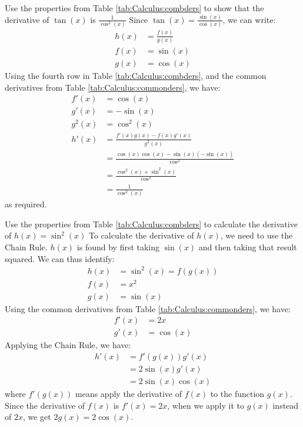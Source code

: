 \begin{example}{Use the properties from Table \ref{tab:Calculus:combders} to show that the derivative of $\tan(x)$ is $\frac{1}{\cos^2(x)}$}
Since $\tan(x)=\frac{\sin(x)}{\cos(x)}$, we can write:
\begin{align*}
h(x) &= \frac{f(x)}{g(x)} \\
f(x) &= \sin(x)\\
g(x) &= \cos(x)
\end{align*}
Using the fourth row in Table \ref{tab:Calculus:combders}, and the common derivatives from Table \ref{tab:Calculus:commonders}, we have:
\begin{align*}
f'(x) &= \cos(x) \\
g'(x) &= -\sin(x) \\
g^2(x) &= \cos^2(x) \\
h'(x) &=\frac{f'(x)g(x)-f(x)g'(x)}{g^2(x)}\\ 
&= \frac{\cos(x)\cos(x) - \sin(x) (-\sin(x))}{\cos^2}\\
&=\frac{\cos^2(x)+\sin^2(x)}{\cos^2}\\
&=\frac{1}{\cos^2(x)}
\end{align*}
as required.
\end{example}

\begin{example}{Use the properties from Table \ref{tab:Calculus:combders} to calculate the derivative of $h(x)=\sin^2(x)$}
To calculate the derivative of $h(x)$, we need to use the Chain Rule. $h(x)$ is found by first taking $\sin(x)$ and then taking that result squared. We can thus identify:
\begin{align*}
h(x) &= \sin^2(x) = f(g(x))\\
f(x) &= x^2 \\
g(x) &= \sin(x)
\end{align*}
Using the common derivatives from Table \ref{tab:Calculus:commonders}, we have:
\begin{align*}
f'(x) &= 2x \\
g'(x) &= \cos(x)
\end{align*}
Applying the Chain Rule, we have:
\begin{align*}
h'(x) &= f'(g(x))g'(x)\\
&= 2\sin(x)g'(x)\\
&= 2\sin(x)\cos(x)
\end{align*}
where $f'(g(x))$ means apply the derivative of $f(x)$ to the function $g(x)$. Since the derivative of $f(x)$ is $f'(x)=2x$, when we apply it to $g(x)$ instead of $2x$, we get $2g(x)=2\cos(x)$.
\end{example}
\newpage
